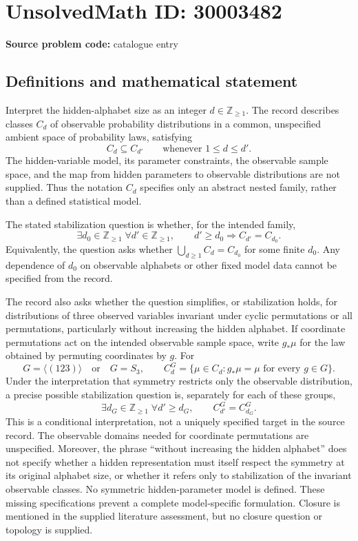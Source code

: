 \documentclass[11pt]{article}
\newcommand{\Z}{\mathbb{Z}}
\begin{document}
\section*{UnsolvedMath ID: 30003482}
\textbf{Source problem code:} catalogue entry
\subsection{Definitions and mathematical statement}
Interpret the hidden-alphabet size as an integer \(d\in\Z_{\geq 1}\). The record describes classes \(C_d\) of observable probability distributions in a common, unspecified ambient space of probability laws, satisfying
\[
C_d\subseteq C_{d'}\qquad\text{whenever }1\leq d\leq d'.
\]
The hidden-variable model, its parameter constraints, the observable sample space, and the map from hidden parameters to observable distributions are not supplied. Thus the notation \(C_d\) specifies only an abstract nested family, rather than a defined statistical model.

The stated stabilization question is whether, for the intended family,
\[
\exists d_0\in\Z_{\geq 1}\;\forall d'\in\Z_{\geq 1},\qquad
 d'\geq d_0\Longrightarrow C_{d'}=C_{d_0}.
\]
Equivalently, the question asks whether \(\bigcup_{d\geq 1}C_d=C_{d_0}\) for some finite \(d_0\). Any dependence of \(d_0\) on observable alphabets or other fixed model data cannot be specified from the record.

The record also asks whether the question simplifies, or stabilization holds, for distributions of three observed variables invariant under cyclic permutations or all permutations, particularly without increasing the hidden alphabet. If coordinate permutations act on the intended observable sample space, write \(g_*\mu\) for the law obtained by permuting coordinates by \(g\). For
\[
G=\langle(123)\rangle\quad\text{or}\quad G=S_3,
\qquad
C_d^G=\{\mu\in C_d:g_*\mu=\mu\text{ for every }g\in G\}.
\]
Under the interpretation that symmetry restricts only the observable distribution, a precise possible stabilization question is, separately for each of these groups,
\[
\exists d_G\in\Z_{\geq 1}\;\forall d'\geq d_G,
\qquad C_{d'}^G=C_{d_G}^G.
\]
This is a conditional interpretation, not a uniquely specified target in the source record. The observable domains needed for coordinate permutations are unspecified. Moreover, the phrase ``without increasing the hidden alphabet'' does not specify whether a hidden representation must itself respect the symmetry at its original alphabet size, or whether it refers only to stabilization of the invariant observable classes. No symmetric hidden-parameter model is defined. These missing specifications prevent a complete model-specific formulation. Closure is mentioned in the supplied literature assessment, but no closure question or topology is supplied.
\end{document}

